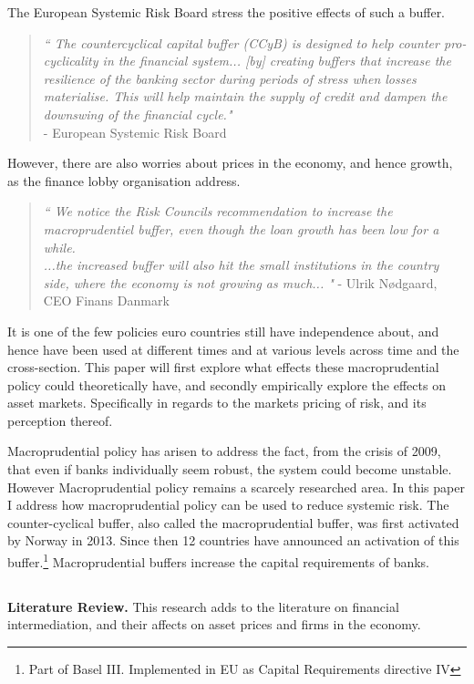 \documentclass[11pt]{article}
\begin{document}
The European Systemic Risk Board stress the positive effects of such a buffer.

\begin{quote}\textit{``
The countercyclical capital buffer (CCyB) is designed to help counter pro-cyclicality in the financial system... [by] creating buffers that increase the resilience of the banking sector during periods of stress when losses materialise. This will help maintain the supply of credit and dampen the downswing of the financial cycle."}\\
\hspace{1em}- {European Systemic Risk Board}
\end{quote}

However, there are also worries about prices in the economy, and hence growth, as the finance lobby organisation address.

\begin{quote}\textit{``
We notice the Risk Councils recommendation to increase the macroprudentiel buffer, even though the loan growth has been low for a while.\\ ...the increased buffer will also hit the small institutions in the country side, where the economy is not growing as much...
"}
- {Ulrik Nødgaard, CEO Finans Danmark}
\end{quote}



It is one of the few policies euro countries still have independence about, and hence have been used at different times and at various levels across time and the cross-section. This paper will first explore what effects these macroprudential policy could theoretically have, and secondly empirically explore the effects on asset markets. Specifically in regards to the markets pricing of risk, and its perception thereof.

Macroprudential policy has arisen to address the fact, from the crisis of 2009, that even if banks individually seem robust, the system could become unstable.
However Macroprudential policy remains a scarcely researched area. In this paper I address how macroprudential policy can be used to reduce systemic risk. The counter-cyclical buffer, also called the macroprudential buffer, was first activated by Norway in 2013. Since then 12 countries have announced an activation of this buffer.\footnote{Part of Basel III. Implemented in EU as Capital Requirements directive IV} Macroprudential buffers increase the capital requirements of banks.


\subsection*{}
\vspace{-1.5cm}
\textbf{Literature Review.} 
This research adds to the literature on financial intermediation, and their affects on asset prices and firms in the economy.
\end{document}
